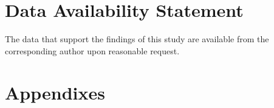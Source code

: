 \documentclass[%
 aip,
 amsmath,amssymb,
 reprint,%
]{revtex4-1}
\begin{document}
\begin{acknowledgments}

\end{acknowledgments}

\section*{Data Availability Statement}
The data that support the findings of this study are available from the corresponding author upon reasonable request.

\appendix

\section{Appendixes}

\end{document}
